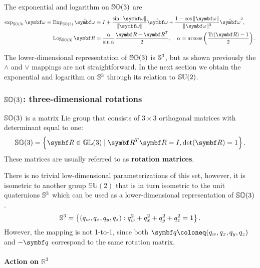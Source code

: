 \begin{important}
  The exponential and logarithm on ${\mathbb{SO}(3)}$ are
  \begin{subequations}
    \begin{align}
      \exp_\SOthree \bomega = \Exp_\SOthree \hat {\bomega} & = I + \frac{\sin \| \bomega \|}{\|\bomega \|} \hat {\bomega} + \frac{1 - \cos \| \bomega \|}{\| \bomega \|^2} \hat {\bomega}^2, \\
      \Log_\SOthree \bR                                    & = \frac{\alpha}{\sin \alpha} \frac{\bR - \bR^T}{2}, \quad \alpha = \arccos \left( \frac{\tr(\bR) - 1}{2} \right).
    \end{align}
  \end{subequations}
\end{important}
The lower-dimensional representation of ${\mathbb{SO}(3)}$ is ${\mathbb{S}^3}$, but as shown previously the $\wedge$ and $\vee$ mappings are not straightforward. In the next section we obtain the exponential and logarithm on ${\mathbb{S}^3}$ through its relation to ${\mathbb{SU}(2)}$.

\subsubsection{\texorpdfstring{${\mathbb{SO}(3)}$}{SO(3)}: three-dimensional rotations}

${\mathbb{SO}(3)}$ is a matrix Lie group that consists of $3 \times 3$ orthogonal matrices with determinant equal to one:
\begin{equation}
  \SOthree = \left\{ \bR \in \mathbb{GL}(3) \mid \bR^T \bR = I, \det(\bR) = 1  \right\}.
\end{equation}
These matrices are usually referred to as \textbf{rotation matrices}.

There is no trivial low-dimensional parameterizations of this set, however, it is isometric to another group $\mathbb{SU}(2)$ that is in turn isometric to the unit quaternions ${\mathbb{S}^3}$ which can be used as a lower-dimensional representation of ${\mathbb{SO}(3)}$.
\begin{equation}
  {\mathbb{S}^3} = \left \{ (q_w, q_x, q_y, q_z)  : q_w^2 + q_x^2 + q_y^2 + q_z^2 = 1 \right\}.
\end{equation}
However, the mapping is not 1-to-1, since both $\bq \coloneq (q_w, q_x, q_y, q_z)$ and $-\bq$ correspond to the same rotation matrix.


\paragraph{Action on \texorpdfstring{$\mathbb{R}^3$}{R3}}

